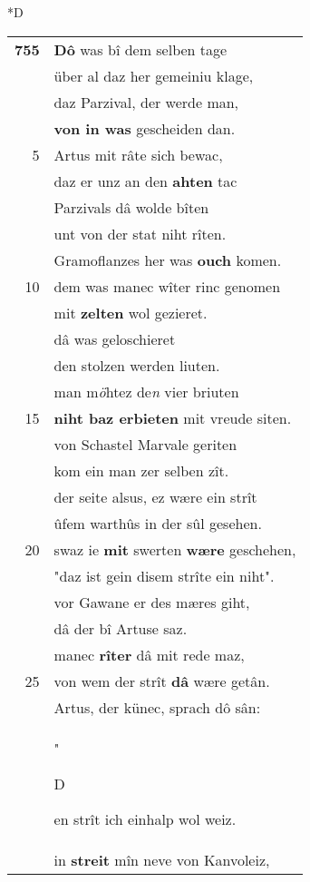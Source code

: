 \documentclass[8pt,a4paper,notitlepage]{article}
\begin{document}
\begin{table}[ht]
\begin{minipage}[t]{0.5\linewidth}
\small
\begin{center}*D
\end{center}
\begin{tabular}{rl}
\textbf{755} & \textbf{Dô} was bî dem selben tage\\ 
 & über al daz her gemeiniu klage,\\ 
 & daz Parzival, der werde man,\\ 
 & \textbf{von in was} gescheiden dan.\\ 
5 & Artus mit râte sich bewac,\\ 
 & daz er unz an den \textbf{ahten} tac\\ 
 & Parzivals dâ wolde bîten\\ 
 & unt von der stat niht rîten.\\ 
 & Gramoflanzes her was \textbf{ouch} komen.\\ 
10 & dem was manec wîter rinc genomen\\ 
 & mit \textbf{zelten} wol gezieret.\\ 
 & dâ was geloschieret\\ 
 & den stolzen werden liuten.\\ 
 & man m\textit{ö}htez de\textit{n} vier briuten\\ 
15 & \textbf{niht baz erbieten} mit vreude siten.\\ 
 & von Schastel Marvale geriten\\ 
 & kom ein man zer selben zît.\\ 
 & der seite alsus, ez wære ein strît\\ 
 & ûfem warthûs in der sûl gesehen.\\ 
20 & swaz ie \textbf{mit} swerten \textbf{wære} geschehen,\\ 
 & "daz ist gein disem strîte ein niht".\\ 
 & vor Gawane er des mæres giht,\\ 
 & dâ der bî Artuse saz.\\ 
 & manec \textbf{rîter} dâ mit rede maz,\\ 
25 & von wem der strît \textbf{dâ} wære getân.\\ 
 & Artus, der künec, sprach dô sân:\\ 
 & "\begin{large}D\end{large}en strît ich einhalp wol weiz.\\ 
 & in \textbf{streit} mîn neve von Kanvoleiz,\\ 

\end{tabular}
\end{minipage}
\end{table}
\end{document}
